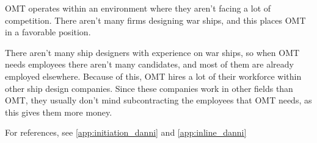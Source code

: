\label{app:omt_environment}
OMT operates within an environment where they aren't facing a lot of competition. 
There aren't many firms designing war ships, and this places OMT in a favorable position.

There aren't many ship designers with experience on war ships, so when OMT needs employees there aren't many candidates, and most of them are already employed elsewhere.
Because of this, OMT hires a lot of their workforce within other ship design companies.
Since these companies work in other fields than OMT, they usually don't mind subcontracting the employees that OMT needs, as this gives them more money. 

For references, see \ref{app:initiation_danni} and \ref{app:inline_danni}